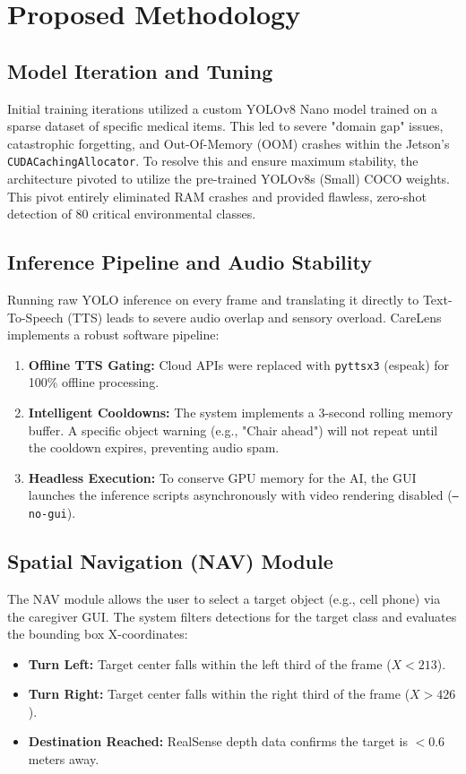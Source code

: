 \documentclass[12pt,onecolumn]{IEEEtran}
\begin{document}
\section{Proposed Methodology}

\subsection{Model Iteration and Tuning}
Initial training iterations utilized a custom YOLOv8 Nano model trained on a sparse dataset of specific medical items. This led to severe "domain gap" issues, catastrophic forgetting, and Out-Of-Memory (OOM) crashes within the Jetson's \texttt{CUDACachingAllocator}. To resolve this and ensure maximum stability, the architecture pivoted to utilize the pre-trained YOLOv8s (Small) COCO weights. This pivot entirely eliminated RAM crashes and provided flawless, zero-shot detection of 80 critical environmental classes.

\subsection{Inference Pipeline and Audio Stability}
Running raw YOLO inference on every frame and translating it directly to Text-To-Speech (TTS) leads to severe audio overlap and sensory overload. CareLens implements a robust software pipeline:
\begin{enumerate}
    \item \textbf{Offline TTS Gating:} Cloud APIs were replaced with \texttt{pyttsx3} (espeak) for 100\% offline processing.
    \item \textbf{Intelligent Cooldowns:} The system implements a 3-second rolling memory buffer. A specific object warning (e.g., "Chair ahead") will not repeat until the cooldown expires, preventing audio spam.
    \item \textbf{Headless Execution:} To conserve GPU memory for the AI, the GUI launches the inference scripts asynchronously with video rendering disabled (\texttt{--no-gui}).
\end{enumerate}

\subsection{Spatial Navigation (NAV) Module}
The NAV module allows the user to select a target object (e.g., cell phone) via the caregiver GUI. The system filters detections for the target class and evaluates the bounding box X-coordinates:
\begin{itemize}
    \item \textbf{Turn Left:} Target center falls within the left third of the frame ($X < 213$).
    \item \textbf{Turn Right:} Target center falls within the right third of the frame ($X > 426$).
    \item \textbf{Destination Reached:} RealSense depth data confirms the target is $< 0.6$ meters away.
\end{itemize}
\end{document}
